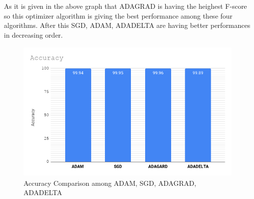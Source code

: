 \documentclass{report}
\begin{document}
As it is given in the above graph that ADAGRAD is having the heighest F-score so this optimizer algorithm is giving the best performance among these four algorithms. After this SGD, ADAM, ADADELTA are having better performances in decreasing order. 

\begin{figure}[htbp]
\label{fig:accuracy}
\centering
\includegraphics[height=7cm]{Pictures/Accuracy_chart.png}
\caption{Accuracy Comparison among ADAM, SGD, ADAGRAD, ADADELTA}
\end{figure}



\end{document}
